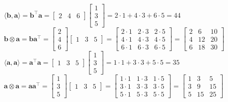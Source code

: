 \documentclass[11pt,letterpaper]{article}
\begin{document}
\begin{enumerate}
\begin{enumerate}
\begin{enumerate}
             $\langle\mathbf{b}, \mathbf{a}\rangle = \mathbf{b}^\top\mathbf{a} = \begin{bmatrix} 2 & 4 & 6 \end{bmatrix} \begin{bmatrix} 1 \\ 3 \\ 5 \end{bmatrix} = 2 \cdot 1 + 4 \cdot 3 + 6 \cdot 5 = 44$\\
             $\mathbf{b} \otimes \mathbf{a} = \mathbf{b}\mathbf{a}^\top = \begin{bmatrix} 2 \\ 4 \\ 6 \end{bmatrix} \begin{bmatrix} 1 & 3 & 5 \end{bmatrix} = \begin{bmatrix} 2 \cdot 1 & 2 \cdot 3 & 2 \cdot 5 \\ 4 \cdot 1 & 4 \cdot 3 & 4 \cdot 5 \\ 6 \cdot 1 & 6 \cdot 3 & 6 \cdot 5 \end{bmatrix} = \begin{bmatrix} 2 & 6 & 10 \\ 4 & 12 & 20 \\ 6 & 18 & 30 \end{bmatrix}$\\
             $\langle\mathbf{a}, \mathbf{a}\rangle = \mathbf{a}^\top\mathbf{a} = \begin{bmatrix} 1 & 3 & 5 \end{bmatrix} \begin{bmatrix} 1 \\ 3 \\ 5 \end{bmatrix} = 1 \cdot 1 + 3 \cdot 3 + 5 \cdot 5 = 35$\\
             $\mathbf{a} \otimes \mathbf{a} = \mathbf{a}\mathbf{a}^\top = \begin{bmatrix} 1 \\ 3 \\ 5 \end{bmatrix} \begin{bmatrix} 1 & 3 & 5 \end{bmatrix} = \begin{bmatrix} 1 \cdot 1 & 1 \cdot 3 & 1 \cdot 5 \\ 3 \cdot 1 & 3 \cdot 3 & 3 \cdot 5 \\ 5 \cdot 1 & 5 \cdot 3 & 5 \cdot 5 \end{bmatrix} = \begin{bmatrix} 1 & 3 & 5 \\ 3 & 9 & 15 \\ 5 & 15 & 25 \end{bmatrix}$\\

\end{enumerate}
\end{enumerate}
\end{enumerate}
\end{document}

